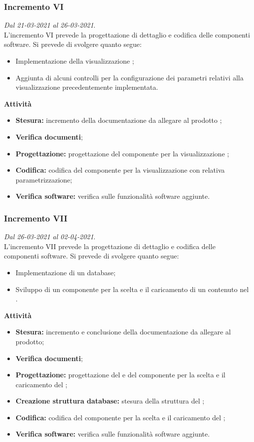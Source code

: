 \subsubsection{Incremento VI}
\textit{Dal 21-03-2021 al 26-03-2021}.\\
L'incremento VI prevede la progettazione di dettaglio e codifica delle componenti software. Si prevede di svolgere quanto segue:
\begin{itemize}
\item Implementazione della visualizzazione ;
\item Aggiunta di alcuni controlli per la configurazione dei parametri relativi alla visualizzazione precedentemente implementata.
\end{itemize}
\textbf{Attività}
\begin{itemize}
\item \textbf{Stesura:} incremento della documentazione da allegare al prodotto ;
\item \textbf{Verifica documenti};
\item \textbf{Progettazione:} progettazione del componente per la visualizzazione ;
\item \textbf{Codifica:} codifica del componente per la visualizzazione con relativa parametrizzazione;
\item \textbf{Verifica software:} verifica sulle funzionalità software aggiunte.
\end{itemize}

\subsubsection{Incremento VII}
\textit{Dal 26-03-2021 al 02-04-2021}.\\
L'incremento VII prevede la progettazione di dettaglio e codifica delle componenti software. Si prevede di svolgere quanto segue:
\begin{itemize}
\item Implementazione di un database;
\item Sviluppo di un componente per la scelta e il caricamento di un  contenuto nel .
\end{itemize}
\textbf{Attività}
\begin{itemize}
\item \textbf{Stesura:} incremento e conclusione della documentazione da allegare al prodotto;
\item \textbf{Verifica documenti};
\item \textbf{Progettazione:} progettazione del  e del componente per la scelta e il caricamento del ;
\item \textbf{Creazione struttura database:} stesura della struttura del ;
\item \textbf{Codifica:} codifica del componente per la scelta e il caricamento del ;
\item \textbf{Verifica software:} verifica sulle funzionalità software aggiunte.
\end{itemize}

